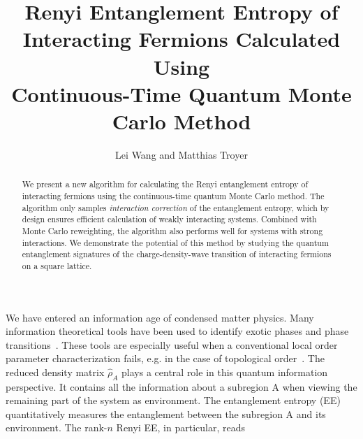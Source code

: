 \documentclass[12pt,onecolumn,english,prl,showpacs,nofootinbib]{revtex4-1}
\begin{document}
\title{Renyi Entanglement Entropy of Interacting Fermions Calculated Using \\Continuous-Time Quantum Monte Carlo Method}

\author{Lei Wang and Matthias Troyer}

\begin{abstract}
We present a new algorithm for calculating the Renyi entanglement entropy of interacting fermions using the continuous-time quantum Monte Carlo method. The algorithm only samples  \emph{interaction correction} of the entanglement entropy, which by design ensures efficient calculation of  weakly interacting systems. Combined with Monte Carlo reweighting, the algorithm also performs well for systems with strong interactions. We demonstrate the potential of this method by studying the quantum entanglement signatures of the charge-density-wave transition of interacting fermions on a square lattice.  
\end{abstract}



\maketitle

\pagestyle{plain}

\noindent
We have entered an information age of condensed matter physics. Many information theoretical tools have been used to identify exotic phases and phase transitions~\cite{Feiguin:2007bo, PhysRevLett.99.140405, Isakov:2011fz, Jiang:2012dw, PhysRevLett.109.067201}. These tools are especially useful when a conventional local order parameter characterization fails, e.g. in the case of topological order~\cite{Wen:1990tm}. The reduced density matrix $\hat{\rho}_{A}$ plays a central role in this quantum information perspective. It contains all the information about a subregion A when viewing the remaining part of the system as environment. The entanglement entropy (EE) quantitatively measures the entanglement between the subregion A and its environment. The rank-$n$ Renyi EE, in particular, reads
\end{document}
